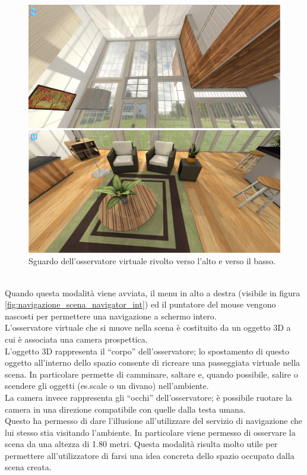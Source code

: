 \begin{figure}[h]
 \centering
 \includegraphics[width=0.80\linewidth]{images/chapter_navigazione_scena/vis_alta_bassa.png}\hfill
 \caption[Esempio 2 di osservazione virtuale]{Sguardo dell'osservatore virtuale rivolto verso l'alto e verso il basso.}
 \label{fig:navigazione_scena_vis_alta_bassa}
\end{figure}
\\
Quando questa modalità viene avviata, il menu in alto a destra (visibile in figura \ref{fig:navigazione_scena_navigator_int}) ed il puntatore del mouse vengono nascosti per permettere una navigazione a schermo intero.
\\
L’osservatore virtuale che si muove nella scena è costituito da un oggetto 3D a cui è associata una camera prospettica.
\\
L’oggetto 3D rappresenta il “corpo” dell’osservatore; lo spostamento di questo oggetto all’interno dello spazio consente di ricreare una passeggiata virtuale nella scena.
In particolare permette di camminare, saltare e, quando possibile, salire o scendere gli oggetti (es.scale o un divano) nell’ambiente.
\\
La camera invece rappresenta gli “occhi” dell’osservatore; è possibile ruotare la camera in una direzione compatibile con quelle dalla testa umana. 
\\
Questo ha permesso di dare l’illusione all’utilizzare del servizio di navigazione che lui stesso stia visitando l’ambiente.
In particolare viene permesso di osservare la scena da una altezza di 1.80 metri. Questa modalità risulta molto utile per permettere all’utilizzatore di farsi una idea concreta dello spazio occupato dalla scena creata.
